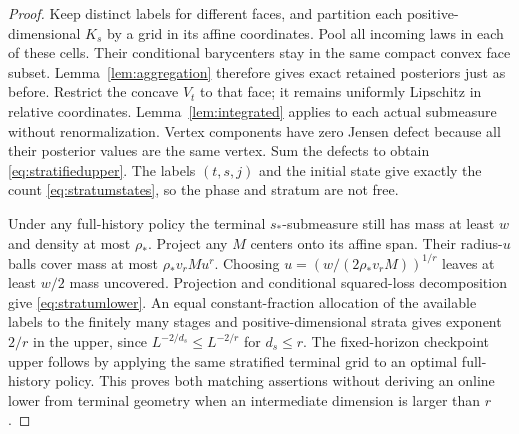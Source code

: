 \begin{proof}
Keep distinct labels for different faces, and partition each positive-dimensional $K_s$ by a grid in its affine coordinates. Pool all incoming laws in each of these cells. Their conditional barycenters stay in the same compact convex face subset. Lemma~\ref{lem:aggregation} therefore gives exact retained posteriors just as before. Restrict the concave $V_t$ to that face; it remains uniformly Lipschitz in relative coordinates. Lemma~\ref{lem:integrated} applies to each actual submeasure without renormalization. Vertex components have zero Jensen defect because all their posterior values are the same vertex. Sum the defects to obtain \eqref{eq:stratifiedupper}. The labels $(t,s,j)$ and the initial state give exactly the count \eqref{eq:stratumstates}, so the phase and stratum are not free.

Under any full-history policy the terminal $s_*$-submeasure still has mass at least $w$ and density at most $\rho_*$. Project any $M$ centers onto its affine span. Their radius-$u$ balls cover mass at most $\rho_*v_rMu^r$. Choosing $u=(w/(2\rho_*v_rM))^{1/r}$ leaves at least $w/2$ mass uncovered. Projection and conditional squared-loss decomposition give \eqref{eq:stratumlower}. An equal constant-fraction allocation of the available labels to the finitely many stages and positive-dimensional strata gives exponent $2/r$ in the upper, since $L^{-2/d_s}\le L^{-2/r}$ for $d_s\le r$. The fixed-horizon checkpoint upper follows by applying the same stratified terminal grid to an optimal full-history policy. This proves both matching assertions without deriving an online lower from terminal geometry when an intermediate dimension is larger than $r$.
\end{proof}


